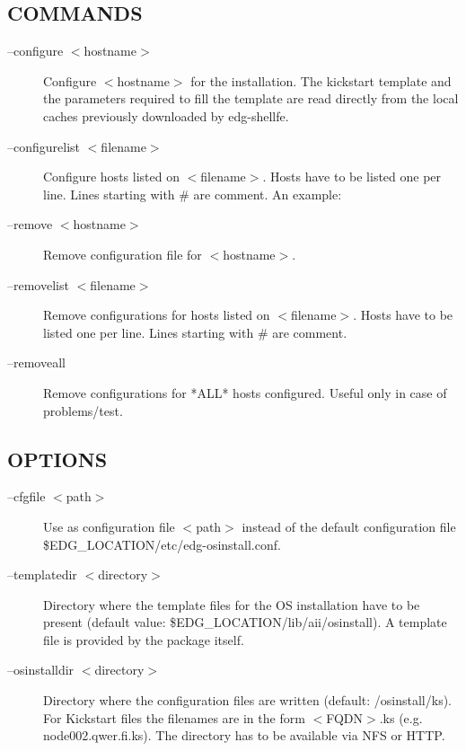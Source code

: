 \subsection*{COMMANDS\label{edg-osinstall_COMMANDS}}
\begin{description}

\item[--configure $<$hostname$>$] \mbox{}

Configure $<$hostname$>$ for the installation. The kickstart template and the
parameters required to fill the template are read directly from the local caches
previously downloaded by edg-shellfe.


\item[--configurelist $<$filename$>$] \mbox{}

Configure hosts listed on $<$filename$>$. Hosts have to be listed one per line.
Lines starting with \# are comment. An example:


\item[--remove $<$hostname$>$] \mbox{}

Remove configuration file for $<$hostname$>$.


\item[--removelist $<$filename$>$] \mbox{}

Remove configurations for hosts listed on $<$filename$>$. Hosts have to
be listed one per line. Lines starting with \# are comment.


\item[--removeall] \mbox{}

Remove configurations for *ALL* hosts configured. Useful only in case
of problems/test.

\end{description}
\subsection*{OPTIONS\label{edg-osinstall_OPTIONS}}
\begin{description}

\item[--cfgfile $<$path$>$] \mbox{}

Use as configuration file $<$path$>$ instead of the default
configuration file \$EDG\_LOCATION/etc/edg-osinstall.conf.


\item[--templatedir $<$directory$>$] \mbox{}

Directory where the template files for the OS installation have to be present
(default value: \$EDG\_LOCATION/lib/aii/osinstall). A template file is
provided by the package itself.


\item[--osinstalldir $<$directory$>$] \mbox{}

Directory where the configuration files are written
(default: /osinstall/ks). For Kickstart files the filenames are in the form $<$FQDN$>$.ks
(e.g. node002.qwer.fi.ks). The directory has to be available via NFS or HTTP.

\end{description}
